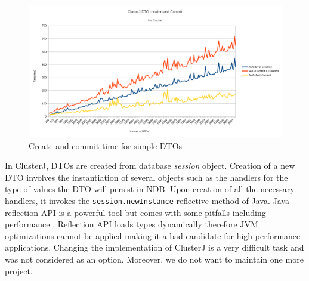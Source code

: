 \begin{figure}
\centering
\includegraphics[scale=0.55]{resources/images/Implementation/dto_create_commit_no_cache.png}
\caption{Create and commit time for simple DTOs}
\label{fig:impl_dto_no_cache}
\end{figure}

In ClusterJ, DTOs are created from database \emph{session} object. Creation
of a new DTO involves the instantiation of several objects such as the
handlers for the type of values the DTO will persist in NDB. Upon creation
of all the necessary handlers, it invokes the
\texttt{session.newInstance} reflective method of Java. Java reflection API is
a powerful tool but comes with some pitfalls including
performance \cite{java_reflection}. Reflection API loads types dynamically therefore JVM
optimizations cannot be applied making it a bad candidate for
high-performance applications. Changing the implementation of ClusterJ
is a very difficult task and was not considered as an
option. Moreover, we do not want to maintain one more project.

